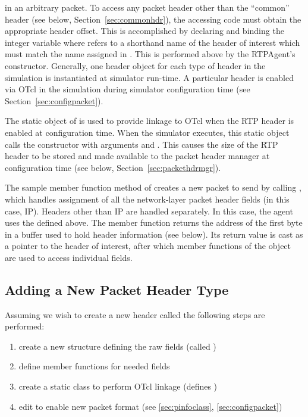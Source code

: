 in an arbitrary packet.
To access any packet header other than the ``common'' header
(see below, Section~\ref{sec:commonhdr}),
the accessing code must obtain the appropriate header offset.
This is accomplished by declaring and binding
the integer variable 
where  refers to a shorthand name
of the header of interest which must match the
name assigned in .
This is performed above by the RTPAgent's constructor.
Generally, one header object for each type of header
in the simulation is instantiated at simulator run-time.
A particular header is enabled via OTcl in the simulation during
simulator configuration time (see Section~\ref{sec:configpacket}).

The static object  of
is used to provide linkage to OTcl when the RTP header is
enabled at configuration time.
When the simulator executes, this static object calls
the  constructor with arguments
 and .
This causes the size of the RTP header to be stored
and made available to the packet header manager
at configuration time (see below, Section~\ref{sec:packethdrmgr}).

The sample member function  method
of  creates a new packet
to send by calling , which handles assignment
of all the network-layer packet header fields (in this case, IP).
Headers other than IP are handled separately.
In this case, the agent uses the  defined above.
The  member function returns the address
of the first byte in a buffer used to hold header information (see below).
Its return value is cast as a pointer to the header of interest,
after which member functions of the 
object are used to access individual fields.

\subsection{Adding a New Packet Header Type}

Assuming we wish to create a new header called 
the following steps are performed:
\begin{enumerate}\itemsep0pt
  \item create a new structure defining the raw fields
        (called )
  \item define member functions for needed fields
  \item create a static class to perform OTcl linkage
        (defines )
  \item edit  to enable new packet format
        (see \ref{sec:pinfoclass}, \ref{sec:configpacket})
\end{enumerate}

